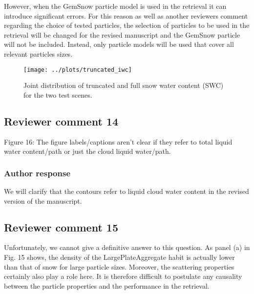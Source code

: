 \documentclass[11pt]{scrartcl}
\begin{document}
However, when the GemSnow particle model is used in the retrieval it can
introduce significant errors. For this reason as well as another reviewers
comment regarding the choice of tested particles, the selection of particles to
be used in the retrieval will be changed for the revised manuscript and the
GemSnow particle will not be included. Instead, only particle models will be used
that cover all relevant particles sizes.

\begin{figure}[!hbpt]
  \begin{center}
  \texttt{[image: ../plots/truncated\_iwc]}
  \caption{Joint distribution of truncated and full snow water content (SWC) for the
    two test scenes.}
  \end{center}
\end{figure}

\subsection*{Reviewer comment 14}

Figure 16: The figure labels/captions aren't clear if they refer to total liquid water
content/path or just the cloud liquid water/path.

\subsubsection{Author response}

We will clarify that the contours refer to liquid cloud water content in the revised
version of the manuscript.

\subsection*{Reviewer comment 15}

Unfortunately, we cannot give a definitive answer to this question. As panel (a) in Fig. 15
shows, the density of the LargePlateAggregate habit is actually lower than that of snow for
large particle sizes. Moreover, the scattering properties certainly also play a role here.
It is therefore difficult to postulate any causality between the particle properties and
the performance in the retrieval.



\end{document}
